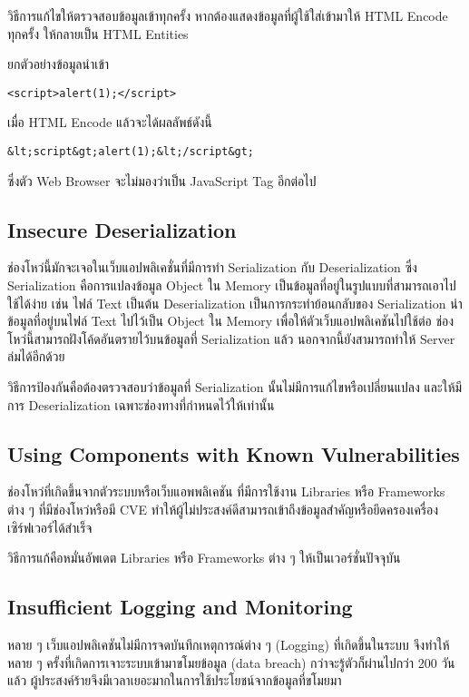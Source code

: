 วิธีการแก้ไขให้ตรวจสอบข้อมูลเข้าทุกครั้ง หากต้องแสดงข้อมูลที่ผู้ใช้ใส่เข้ามาให้ HTML Encode ทุกครั้ง ให้กลายเป็น HTML Entities

ยกตัวอย่างข้อมูลนำเข้า

\begin{lstlisting}[numbers=none] 
<script>alert(1);</script>
\end{lstlisting}

เมื่อ HTML Encode แล้วจะได้ผลลัพธ์ดังนี้

\begin{lstlisting}[numbers=none] 
&lt;script&gt;alert(1);&lt;/script&gt;
\end{lstlisting}

ซึ่งตัว Web Browser จะไม่มองว่าเป็น JavaScript Tag อีกต่อไป

\subsection{Insecure Deserialization}
ช่องโหว่นี้มักจะเจอในเว็บแอปพลิเคชั่นที่มีการทำ Serialization กับ Deserialization ซึ่ง Serialization คือการแปลงข้อมูล Object ใน Memory เป็นข้อมูลที่อยู่ในรูปแบบที่สามารถเอาไปใช้ได้ง่าย เช่น ไฟล์ Text เป็นต้น Deserialization เป็นการกระทำย้อนกลับของ Serialization นำข้อมูลที่อยู่บนไฟล์ Text ไปไว้เป็น Object ใน Memory เพื่อให้ตัวเว็บแอปพลิเคชันไปใช้ต่อ ช่องโหว่นี้สามารถฝังโค้ดอันตรายไว้บนข้อมูลที่ Serialization แล้ว นอกจากนี้ยังสามารถทำให้ Server ล่มได้อีกด้วย

วิธีการป้องกันคือต้องตรวจสอบว่าข้อมูลที่ Serialization นั้นไม่มีการแก้ไขหรือเปลี่ยนแปลง และให้มีการ Deserialization เฉพาะช่องทางที่กำหนดไว้ให้เท่านั้น

\subsection{Using Components with Known Vulnerabilities}

ช่องโหว่ที่เกิดขึ้นจากตัวระบบหรือเว็บแอพพลิเคชัน ที่มีการใช้งาน Libraries หรือ Frameworks ต่าง ๆ ที่มีช่องโหว่หรือมี CVE ทำให้ผู้ไม่ประสงค์ดีสามารถเข้าถึงข้อมูลสำคัญหรือยึดครองเครื่องเซิร์ฟเวอร์ได้สำเร็จ

วิธีการแก้คือหมั่นอัพเดต Libraries หรือ Frameworks ต่าง ๆ ให้เป็นเวอร์ชั่นปัจจุบัน

\subsection{Insufficient Logging and Monitoring}
หลาย ๆ เว็บแอปพลิเคชันไม่มีการจดบันทึกเหตุการณ์ต่าง ๆ (Logging) ที่เกิดขึ้นในระบบ จึงทำให้หลาย ๆ ครั้งที่เกิดการเจาะระบบเข้ามาขโมยข้อมูล (data breach) กว่าจะรู้ตัวก็ผ่านไปกว่า 200 วันแล้ว \cite{???} ผู้ประสงค์ร้ายจึงมีเวลาเยอะมากในการใช้ประโยชน์จากข้อมูลที่ขโมยมา

